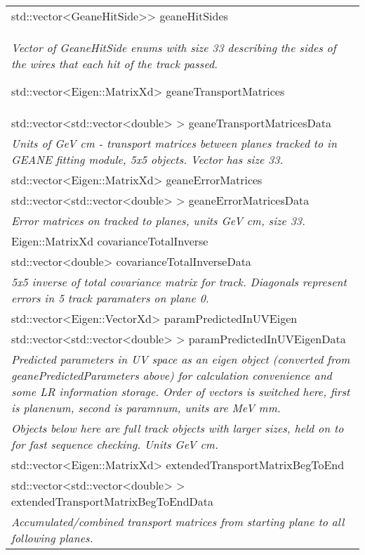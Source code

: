 \begin{longtable}{|p{16cm}|}
std::vector\textless{}GeaneHitSide>\textgreater{} geaneHitSides \\
\textit{Vector of GeaneHitSide enums with size 33 describing the sides of the wires that each hit of the track passed.}
 

std::vector\textless{}Eigen::MatrixXd\textgreater{} geaneTransportMatrices \\
std::vector\textless{}std::vector\textless{}double\textgreater{} \textgreater{} geaneTransportMatricesData \\ 
\textit{Units of GeV cm - transport matrices between planes tracked to in GEANE fitting module, 5x5 objects. Vector has size 33.} \\ \hline

std::vector\textless{}Eigen::MatrixXd\textgreater{} geaneErrorMatrices \\ 
std::vector\textless{}std::vector\textless{}double\textgreater{} \textgreater{} geaneErrorMatricesData \\ 
\textit{Error matrices on tracked to planes, units GeV cm, size 33.} \\ \hline

Eigen::MatrixXd covarianceTotalInverse \\
std::vector\textless{}double\textgreater{} covarianceTotalInverseData \\
\textit{5x5 inverse of total covariance matrix for track. Diagonals represent errors in 5 track paramaters on plane 0.} \\ \hline

std::vector\textless{}Eigen::VectorXd\textgreater{} paramPredictedInUVEigen \\ 
std::vector\textless{}std::vector\textless{}double\textgreater{} \textgreater{} paramPredictedInUVEigenData \\ 
\textit{Predicted parameters in UV space as an eigen object (converted from geanePredictedParameters above) for calculation convenience and some LR information storage. Order of vectors is switched here, first is planenum, second is paramnum, units are MeV mm.} \\ \hline

\textit{Objects below here are full track objects with larger sizes, held on to for fast sequence checking. Units GeV cm.} \\ \hline

std::vector\textless{}Eigen::MatrixXd\textgreater{} extendedTransportMatrixBegToEnd \\
std::vector\textless{}std::vector\textless{}double\textgreater{} \textgreater{} extendedTransportMatrixBegToEndData \\ 
\textit{Accumulated/combined transport matrices from starting plane to all following planes.} \\ \hline


\end{longtable}

